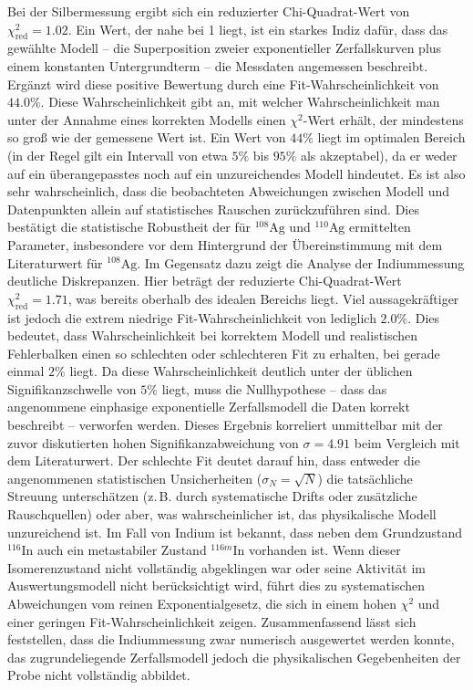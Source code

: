 Bei der Silbermessung ergibt sich ein reduzierter Chi-Quadrat-Wert von $\chi^2_{\text{red}} = 1.02$. Ein Wert, der nahe bei 1 liegt, ist ein starkes Indiz dafür, dass das gewählte Modell -- die Superposition zweier exponentieller Zerfallskurven plus einem konstanten Untergrundterm -- die Messdaten angemessen beschreibt. Ergänzt wird diese positive Bewertung durch eine Fit-Wahrscheinlichkeit von $44.0\%$. Diese Wahrscheinlichkeit gibt an, mit welcher Wahrscheinlichkeit man unter der Annahme eines korrekten Modells einen $\chi^2$-Wert erhält, der mindestens so groß wie der gemessene Wert ist. Ein Wert von $44\%$ liegt im optimalen Bereich (in der Regel gilt ein Intervall von etwa $5\%$ bis $95\%$ als akzeptabel), da er weder auf ein überangepasstes noch auf ein unzureichendes Modell hindeutet. Es ist also sehr wahrscheinlich, dass die beobachteten Abweichungen zwischen Modell und Datenpunkten allein auf statistisches Rauschen zurückzuführen sind. Dies bestätigt die statistische Robustheit der für $^{108}\text{Ag}$ und $^{110}\text{Ag}$ ermittelten Parameter, insbesondere vor dem Hintergrund der Übereinstimmung mit dem Literaturwert für $^{108}\text{Ag}$.
Im Gegensatz dazu zeigt die Analyse der Indiummessung deutliche Diskrepanzen. Hier beträgt der reduzierte Chi-Quadrat-Wert $\chi^2_{\text{red}} = 1.71$, was bereits oberhalb des idealen Bereichs liegt. Viel aussagekräftiger ist jedoch die extrem niedrige Fit-Wahrscheinlichkeit von lediglich $2.0\%$. Dies bedeutet, dass Wahrscheinlichkeit bei korrektem Modell und realistischen Fehlerbalken einen so schlechten oder schlechteren Fit zu erhalten, bei gerade einmal $2\%$ liegt. Da diese Wahrscheinlichkeit deutlich unter der üblichen Signifikanzschwelle von $5\%$ liegt, muss die Nullhypothese -- dass das angenommene einphasige exponentielle Zerfallsmodell die Daten korrekt beschreibt -- verworfen werden. 
Dieses Ergebnis korreliert unmittelbar mit der zuvor diskutierten hohen Signifikanzabweichung von $\sigma = 4.91$ beim Vergleich mit dem Literaturwert. Der schlechte Fit deutet darauf hin, dass entweder die angenommenen statistischen Unsicherheiten ($\sigma_N = \sqrt{N}$) die tatsächliche Streuung unterschätzen (z.\,B. durch systematische Drifts oder zusätzliche Rauschquellen) oder aber, was wahrscheinlicher ist, das physikalische Modell unzureichend ist. Im Fall von Indium ist bekannt, dass neben dem Grundzustand $^{116}\text{In}$ auch ein metastabiler Zustand $^{116m}\text{In}$ vorhanden ist. Wenn dieser Isomerenzustand nicht vollständig abgeklingen war oder seine Aktivität im Auswertungsmodell nicht berücksichtigt wird, führt dies zu systematischen Abweichungen vom reinen Exponentialgesetz, die sich in einem hohen $\chi^2$ und einer geringen Fit-Wahrscheinlichkeit zeigen. Zusammenfassend lässt sich feststellen, dass die Indiummessung zwar numerisch ausgewertet werden konnte, das zugrundeliegende Zerfallsmodell jedoch die physikalischen Gegebenheiten der Probe nicht vollständig abbildet.

